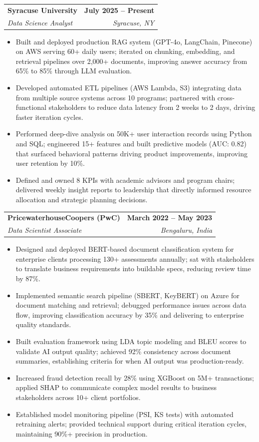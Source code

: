 \documentclass[letterpaper,10pt]{article}
\makeatletter
\newcommand{\resumeItem}[1]{
  \item\small{#1 \vspace{-1pt}}
}
\newcommand{\resumeSubheading}[4]{
  \vspace{-2pt}\item
    \begin{tabular*}{1.0\textwidth}[t]{l@{\extracolsep{\fill}}r}
      \textbf{#1} & \textbf{\small #2} \\
      \textit{\small#3} & \textit{\small #4} \\
    \end{tabular*}\vspace{-5pt}
}
\newcommand{\resumeItemListStart}{\begin{itemize}[leftmargin=0.15in]}
\newcommand{\resumeItemListEnd}{\end{itemize}\vspace{-3pt}}
\makeatother
\begin{document}
    \resumeSubheading
      {Syracuse University}{July 2025 -- Present}
      {Data Science Analyst}{Syracuse, NY}
      \resumeItemListStart
        \resumeItem{Built and deployed production RAG system (GPT-4o, LangChain, Pinecone) on AWS serving 60+ daily users; iterated on chunking, embedding, and retrieval pipelines over 2,000+ documents, improving answer accuracy from 65\% to 85\% through LLM evaluation.}
        \resumeItem{Developed automated ETL pipelines (AWS Lambda, S3) integrating data from multiple source systems across 10 programs; partnered with cross-functional stakeholders to reduce data latency from 2 weeks to 2 days, driving faster iteration cycles.}
        \resumeItem{Performed deep-dive analysis on 50K+ user interaction records using Python and SQL; engineered 15+ features and built predictive models (AUC: 0.82) that surfaced behavioral patterns driving product improvements, improving user retention by 10\%.}
        \resumeItem{Defined and owned 8 KPIs with academic advisors and program chairs; delivered weekly insight reports to leadership that directly informed resource allocation and strategic planning decisions.}
      \resumeItemListEnd

    \resumeSubheading
      {PricewaterhouseCoopers (PwC)}{March 2022 -- May 2023}
      {Data Scientist Associate}{Bengaluru, India}
      \resumeItemListStart
        \resumeItem{Designed and deployed BERT-based document classification system for enterprise clients processing 130+ assessments annually; sat with stakeholders to translate business requirements into buildable specs, reducing review time by 87\%.}
        \resumeItem{Implemented semantic search pipeline (SBERT, KeyBERT) on Azure for document matching and retrieval; debugged performance issues across data flow, improving classification accuracy by 35\% and delivering to enterprise quality standards.}
        \resumeItem{Built evaluation framework using LDA topic modeling and BLEU scores to validate AI output quality; achieved 92\% consistency across document summaries, establishing criteria for when AI output was production-ready.}
        \resumeItem{Increased fraud detection recall by 28\% using XGBoost on 5M+ transactions; applied SHAP to communicate complex model results to business stakeholders across 10+ client portfolios.}
        \resumeItem{Established model monitoring pipeline (PSI, KS tests) with automated retraining alerts; provided technical support during critical iteration cycles, maintaining 90\%+ precision in production.}
      \resumeItemListEnd
\end{document}
